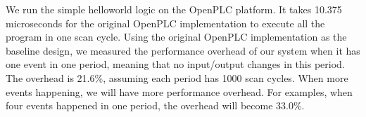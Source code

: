 We run the simple helloworld logic on the OpenPLC platform. It takes 10.375 microseconds for the original OpenPLC implementation to execute all the program in one scan cycle. Using the original OpenPLC implementation as the baseline design, we measured the performance overhead of our system when it has one event in one period, meaning that no input/output changes in this period. The overhead is 21.6\%, assuming each period has 1000 scan cycles. When more events happening, we will have more performance overhead. For examples, when four events happened in one period, the overhead will become 33.0\%.   

  